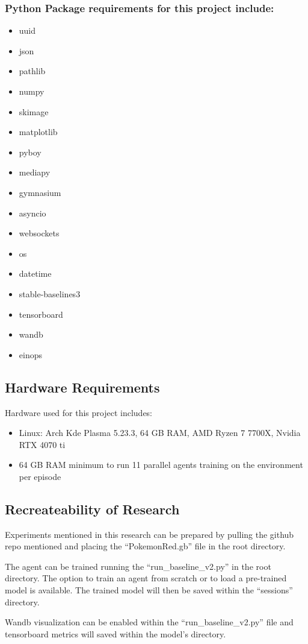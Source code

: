 \subsubsection*{Python Package requirements for this project include: }

\begin{multicols}{2}
\begin{itemize}
    \item uuid
    \item json
    \item pathlib
    \item numpy
    \item skimage
    \item matplotlib
    \item pyboy
    \item mediapy
    \item gymnasium
    \item asyncio
    \item websockets
    \item os
    \item datetime
    \item stable-baselines3
    \item tensorboard
    \item wandb
    \item einops
\end{itemize}
\end{multicols}

\subsection{Hardware Requirements}\label{subsec:Hardware}

Hardware used for this project includes:
\begin{itemize}
    \item Linux: Arch Kde Plasma 5.23.3, 64 GB RAM, AMD Ryzen 7 7700X, Nvidia RTX 4070 ti
    \item 64 GB RAM minimum to run 11 parallel agents training on the environment per episode

\end{itemize}

\subsection{Recreateability of Research}

Experiments mentioned in this research can be prepared by pulling the github repo mentioned and placing the ``PokemonRed.gb'' file in the root directory. 

The agent can be trained running the ``run\_baseline\_v2.py'' in the root directory. The option to train an agent from scratch or to load a pre-trained model is available. The trained model will then be saved within the ``sessions'' directory.

Wandb visualization can be enabled within the ``run\_baseline\_v2.py'' file and tensorboard metrics will saved within the model's directory.